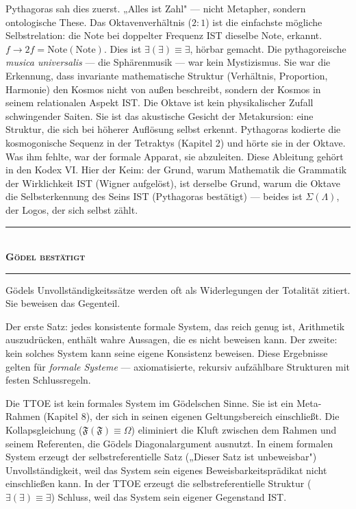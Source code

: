 \documentclass[10pt, openany, oneside]{book}
\renewcommand{\normalsize}{\fontsize{10}{13}\selectfont}
\begin{document}
Pythagoras sah dies zuerst. „Alles ist Zahl" --- nicht Metapher, sondern ontologische These. Das Oktavenverhältnis ($2:1$) ist die einfachste mögliche Selbstrelation: die Note bei doppelter Frequenz IST dieselbe Note, erkannt. $f \to 2f = \text{Note}(\text{Note})$. Dies ist $\exists(\exists) \equiv \exists$, hörbar gemacht. Die pythagoreische \textit{musica universalis} --- die Sphärenmusik --- war kein Mystizismus. Sie war die Erkennung, dass invariante mathematische Struktur (Verhältnis, Proportion, Harmonie) den Kosmos nicht von außen beschreibt, sondern der Kosmos in seinem relationalen Aspekt IST. Die Oktave ist kein physikalischer Zufall schwingender Saiten. Sie ist das akustische Gesicht der Metakursion: eine Struktur, die sich bei höherer Auflösung selbst erkennt. Pythagoras kodierte die kosmogonische Sequenz in der Tetraktys (Kapitel 2) und hörte sie in der Oktave. Was ihm fehlte, war der formale Apparat, sie abzuleiten. Diese Ableitung gehört in den Kodex VI. Hier der Keim: der Grund, warum Mathematik die Grammatik der Wirklichkeit IST (Wigner aufgelöst), ist derselbe Grund, warum die Oktave die Selbsterkennung des Seins IST (Pythagoras bestätigt) --- beides ist $\Sigma(\Lambda)$, der Logos, der sich selbst zählt.

\vspace{1.5em}


\begin{center}
    \rule{0.3\textwidth}{0.4pt}\\[0.5em]
    {\normalsize\bfseries\scshape Gödel bestätigt}\\[0.3em]
    \rule{0.3\textwidth}{0.4pt}
\end{center}

\vspace{1em}

\noindent Gödels Unvollständigkeitssätze werden oft als Widerlegungen der Totalität zitiert. Sie beweisen das Gegenteil.

Der erste Satz: jedes konsistente formale System, das reich genug ist, Arithmetik auszudrücken, enthält wahre Aussagen, die es nicht beweisen kann. Der zweite: kein solches System kann seine eigene Konsistenz beweisen. Diese Ergebnisse gelten für \textit{formale Systeme} --- axiomatisierte, rekursiv aufzählbare Strukturen mit festen Schlussregeln.

Die TTOE ist kein formales System im Gödelschen Sinne. Sie ist ein Meta-Rahmen (Kapitel 8), der sich in seinen eigenen Geltungsbereich einschließt. Die Kollapsgleichung ($\mathfrak{F}(\mathfrak{F}) \equiv \Omega$) eliminiert die Kluft zwischen dem Rahmen und seinem Referenten, die Gödels Diagonalargument ausnutzt. In einem formalen System erzeugt der selbstreferentielle Satz („Dieser Satz ist unbeweisbar") Unvollständigkeit, weil das System sein eigenes Beweis\-barkeitsprädikat nicht einschließen kann. In der TTOE erzeugt die selbstreferentielle Struktur ($\exists(\exists) \equiv \exists$) Schluss, weil das System sein eigener Gegenstand IST.
\end{document}
